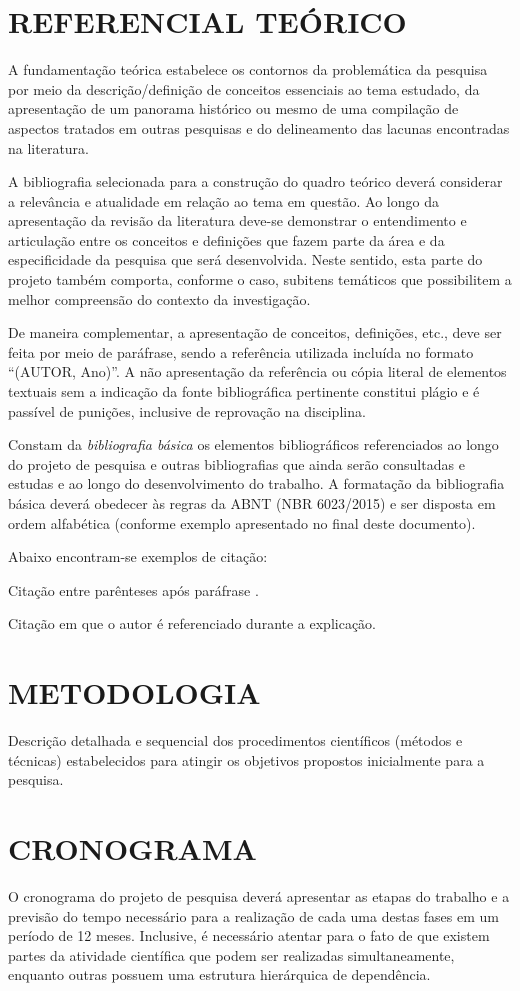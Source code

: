 \documentclass[12pt,a4paper]{article}
\begin{document}
\section{REFERENCIAL TEÓRICO}
A fundamentação teórica estabelece os contornos da problemática da pesquisa por meio da descrição/definição de conceitos essenciais ao tema estudado, da apresentação de um panorama histórico ou mesmo de uma compilação de aspectos tratados em outras pesquisas e do delineamento das lacunas encontradas na literatura.

A bibliografia selecionada para a construção do quadro teórico deverá considerar a relevância e atualidade em relação ao tema em questão. Ao longo da apresentação da revisão da literatura deve-se demonstrar o entendimento e articulação entre os conceitos e definições que fazem parte da área e da especificidade da pesquisa que será desenvolvida. Neste sentido, esta parte do projeto também comporta, conforme o caso, subitens temáticos que possibilitem a melhor compreensão do contexto da investigação.

De maneira complementar, a apresentação de conceitos, definições, etc., deve ser feita por meio de paráfrase, sendo a referência utilizada incluída no formato ``(AUTOR, Ano)''. A não apresentação da referência ou cópia literal de elementos textuais sem a indicação da fonte bibliográfica pertinente constitui plágio e é passível de punições, inclusive de reprovação na disciplina.

Constam da {\it bibliografia básica} os elementos bibliográficos referenciados ao longo do projeto de pesquisa e outras bibliografias que ainda serão consultadas e estudas e ao longo do desenvolvimento do trabalho. A formatação da bibliografia básica deverá obedecer às regras da ABNT (NBR 6023/2015) e ser disposta em ordem alfabética (conforme exemplo apresentado no final deste documento).

Abaixo encontram-se exemplos de citação:

Citação entre parênteses após paráfrase \cite{andrade99}.

Citação em que o autor  é referenciado durante a explicação.

\section{METODOLOGIA}
Descrição detalhada e sequencial dos procedimentos científicos (métodos e técnicas) estabelecidos para atingir os objetivos propostos inicialmente para a pesquisa.

\section{CRONOGRAMA}
O cronograma do projeto de pesquisa deverá apresentar as etapas do trabalho e a previsão do tempo necessário para a realização de cada uma destas fases em um período de 12 meses. Inclusive, é necessário atentar para o fato de que existem partes da atividade científica que podem ser realizadas simultaneamente, enquanto outras possuem uma estrutura hierárquica de dependência.

\def\refname{REFERÊNCIAS BIBLIOGRÁFICAS}


\end{document}
